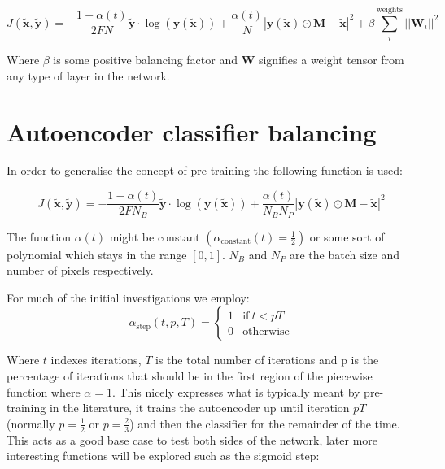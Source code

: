     \begin{equation} \label{eq:l2_cost_model}
        J(\tilde{\mathbf{x}},\tilde{\mathbf{y}}) = -\frac{1-\alpha(t)}{2FN}\tilde{\mathbf{y}}\cdot\log(\mathbf{y}(\tilde{\mathbf{x}}))
        + \frac{\alpha(t)}{N}\left |\mathbf{y}(\tilde{\mathbf{x}}) \odot \mathbf{M}-\tilde{\mathbf{x}}\right | ^2
        + \beta \sum_i^{\text{weights}}||\mathbf{W}_i||^2
    \end{equation}

    Where $\beta$ is some positive balancing factor and $\mathbf{W}$ signifies
    a weight tensor from any type of layer in the network.



  \section{Autoencoder classifier balancing}
    \label{sec:autoalpha}
    In order to generalise the concept of pre-training the following function is used:

    \begin{equation}
      J(\tilde{\mathbf{x}},\tilde{\mathbf{y}}) = -\frac{1-\alpha(t)}{2FN_B}\tilde{\mathbf{y}}\cdot\log(\mathbf{y}(\tilde{\mathbf{x}}))
      + \frac{\alpha(t)}{N_BN_P}\left |\mathbf{y}(\tilde{\mathbf{x}}) \odot \mathbf{M}-\tilde{\mathbf{x}}\right | ^2
    \end{equation}

    The function $\alpha(t)$ might be constant $\left ( \alpha_{\text{constant}}(t)=\frac{1}{2} \right )$ or
    some sort of polynomial which stays in the range $[0,1]$. $N_B$ and $N_P$ are the batch size and number of pixels respectively.

    For much of the initial investigations we employ:
    \begin{equation}
      \alpha_{\text{step}}(t,p,T) =
      \begin{cases}
        1           & \text{if}\ t<pT \\
        0           & \text{otherwise}
      \end{cases}
    \end{equation}

    Where $t$ indexes iterations, $T$ is the total number of iterations and p is the
    percentage of iterations that should be in the first region of the piecewise function
    where $\alpha=1$.
    This nicely expresses what is typically meant by pre-training in the literature, it trains
    the autoencoder up until iteration $pT$ (normally $p=\frac{1}{2}$ or $p=\frac{2}{3}$) and then the classifier for the remainder of the time.
    This acts as a good base case to test both sides of the network, later more interesting
    functions will be explored such as the sigmoid step:


